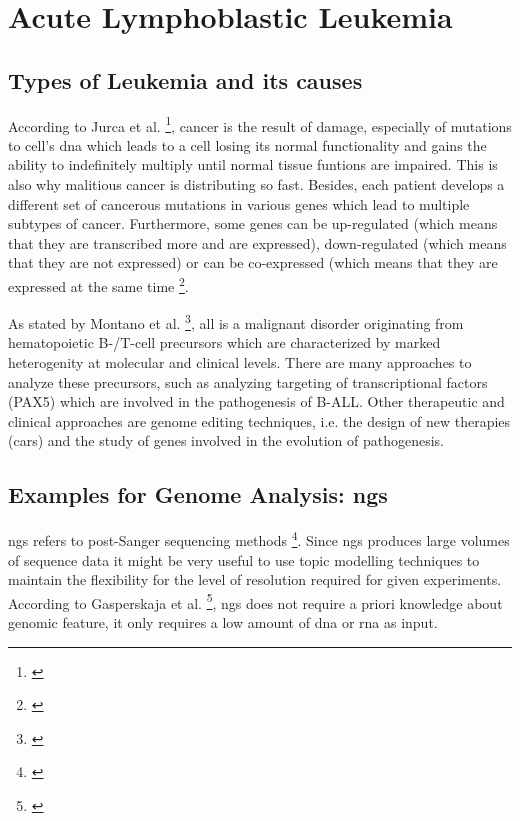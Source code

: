 \chapter{Acute Lymphoblastic Leukemia}\label{all}
\section{Types of Leukemia and its causes}\label{leukemia_types}
According to Jurca et al. \footnote{\autocite{jurca_2016}}, cancer is the result of damage, especially of mutations to cell's \gls{dna} which leads to a cell losing its normal functionality and gains the ability to indefinitely multiply until normal tissue funtions are impaired. This is also why malitious cancer is distributing so fast. Besides, each patient develops a different set of cancerous mutations in various genes which lead to multiple subtypes of cancer.
Furthermore, some genes can be up-regulated (which means that they are transcribed more and are expressed), down-regulated (which means that they are not expressed) or can be co-expressed (which means that they are expressed at the same time \footnote{\autocite{jurca_2016}}.

As stated by Montano et al. \footnote{\autocite{montano_2018}}, \gls{all} is a malignant disorder originating from hematopoietic B-/T-cell precursors which are characterized by marked heterogenity at molecular and clinical levels. There are many approaches to analyze these precursors, such as analyzing targeting of transcriptional factors (PAX5) which are involved in the pathogenesis of B-ALL. Other therapeutic and clinical approaches are genome editing techniques, i.e. the design of new therapies (\gls{car}s) and the study of genes involved in the evolution of pathogenesis.

\section{Examples for Genome Analysis: \gls{ngs}}\label{genome_analysis}
\gls{ngs} refers to post-Sanger sequencing methods \footnote{\autocite{zhao_2016}}. Since \gls{ngs} produces large volumes of sequence data it might be very useful to use topic modelling techniques to maintain the flexibility for the level of resolution required for given experiments.  
According to Gasperskaja et al. \footnote{\autocite{gasperskaja_2017}}, \gls{ngs} does not require a priori knowledge about genomic feature, it only requires a low amount of \gls{dna} or \gls{rna} as input.

